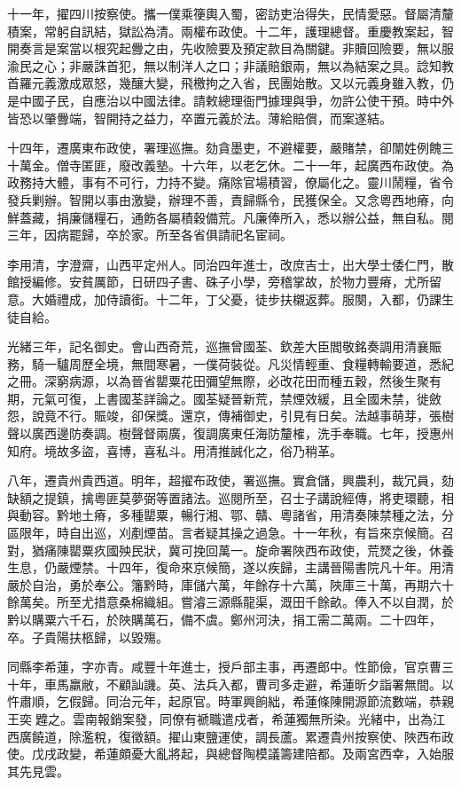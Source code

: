 \begin{pinyinscope}
十一年，擢四川按察使。攜一僕乘箯輿入蜀，密訪吏治得失，民情愛惡。督屬清釐積案，常躬自訊結，獄訟為清。兩權布政使。十二年，護理總督。重慶教案起，智開奏言是案當以根究起釁之由，先收險要及預定款目為關鍵。非贖回險要，無以服渝民之心；非嚴誅首犯，無以制洋人之口；非議賠銀兩，無以為結案之具。諗知教首羅元義激成眾怒，幾釀大變，飛檄拘之入省，民團始散。又以元義身雖入教，仍是中國子民，自應治以中國法律。請敕總理衙門據理與爭，勿許公使干預。時中外皆恐以肇釁端，智開持之益力，卒置元義於法。薄給賠償，而案遂結。

十四年，遷廣東布政使，署理巡撫。劾貪墨吏，不避權要，嚴賭禁，卻闈姓例餽三十萬金。僧寺匿匪，廢改義塾。十六年，以老乞休。二十一年，起廣西布政使。為政務持大體，事有不可行，力持不變。痛除官場積習，僚屬化之。靈川鬧糧，省令發兵剿辦。智開以事由激變，辦理不善，責歸縣令，民獲保全。又念粵西地瘠，向鮮蓋藏，捐廉儲糧石，通飭各屬積穀備荒。凡廉俸所入，悉以辦公益，無自私。閱三年，因病罷歸，卒於家。所至各省俱請祀名宦祠。

李用清，字澄齋，山西平定州人。同治四年進士，改庶吉士，出大學士倭仁門，散館授編修。安貧厲節，日研四子書、硃子小學，旁稽掌故，於物力豐瘠，尤所留意。大婚禮成，加侍讀銜。十二年，丁父憂，徒步扶櫬返葬。服闋，入都，仍課生徒自給。

光緒三年，記名御史。會山西奇荒，巡撫曾國荃、欽差大臣閻敬銘奏調用清襄賑務，騎一驢周歷全境，無間寒暑，一僕荷裝從。凡災情輕重、食糧轉輸要道，悉紀之冊。深窮病源，以為晉省罌粟花田彌望無際，必改花田而種五穀，然後生聚有期，元氣可復，上書國荃詳論之。國荃疑晉新荒，禁煙效緩，且全國未禁，徙斂怨，說竟不行。賑竣，卻保獎。還京，傳補御史，引見有日矣。法越事萌芽，張樹聲以廣西邊防奏調。樹聲督兩廣，復調廣東任海防釐榷，洗手奉職。七年，授惠州知府。境故多盜，喜博，喜私斗。用清推誠化之，俗乃稍革。

八年，遷貴州貴西道。明年，超擢布政使，署巡撫。實倉儲，興農利，裁冗員，劾缺額之提鎮，擒粵匪莫夢弼等置諸法。巡閱所至，召士子講說經傳，將吏環聽，相與動容。黔地土瘠，多種罌粟，暢行湘、鄂、贛、粵諸省，用清奏陳禁種之法，分區限年，時自出巡，刈剷煙苗。言者疑其操之過急。十一年秋，有旨來京候簡。召對，猶痛陳罌粟疚國殃民狀，冀可挽回萬一。旋命署陜西布政使，荒燹之後，休養生息，仍嚴煙禁。十四年，復命來京候簡，遂以疾歸，主講晉陽書院凡十年。用清嚴於自治，勇於奉公。籓黔時，庫儲六萬，年餘存十六萬，陜庫三十萬，再期六十餘萬矣。所至尤措意桑棉織組。嘗濬三源縣龍渠，溉田千餘畝。俸入不以自潤，於黔以購粟六千石，於陜購萬石，備不虞。鄭州河決，捐工需二萬兩。二十四年，卒。子貴陽扶柩歸，以毀殤。

同縣李希蓮，字亦青。咸豐十年進士，授戶部主事，再遷郎中。性節儉，官京曹三十年，車馬羸敝，不顧訕譏。英、法兵入都，曹司多走避，希蓮昕夕詣署無間。以忤肅順，乞假歸。同治元年，起原官。時軍興餉絀，希蓮條陳開源節流數端，恭親王奕韙之。雲南報銷案發，同僚有褫職遣戍者，希蓮獨無所染。光緒中，出為江西廣饒道，除濫稅，復徵額。擢山東鹽運使，調長蘆。累遷貴州按察使、陜西布政使。戊戌政變，希蓮頗憂大亂將起，與總督陶模議籌建陪都。及兩宮西幸，入始服其先見雲。


\end{pinyinscope}
